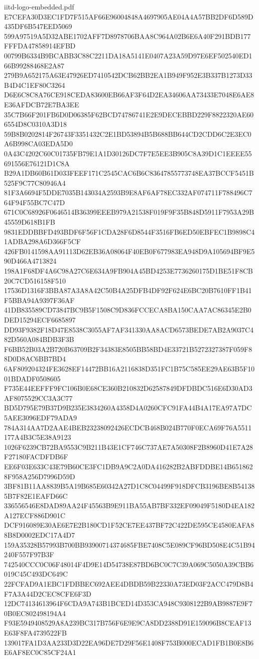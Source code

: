 \begin{filecontents*}[overwrite]{iitd-logo-embedded.pdf}
E7CEFA30D3EC1FD7F515AF66E96004848A4697905AE04A4A57BB2DF6D589D435DF6B547EED5069
599A97519A5D32ABE1702AFF7D8978706BAA8C964A02B6E6A40F291BDB177FFFDA47858914EFBD
00799B6334B9BCABB3C88C2211DA18A5141E0407A23A59D97E6EF502540ED166B99288468E2A87
279B9A652175A63E47926ED7410542DCB62BB2EA1B949F952E3B337B1273D33B4D4C1EF80C3264
D6E6C8C8A76CE918CEDA83600EB66AF3F64D2EA34606AA73433E7048E6AE8E36AFDCB72E7BA3EE
35C7B66F201FB6D0D06385F62BCD74786741E2E9DECEBBD229F8822320AE606554D8C0310A3D18
59B8B0202814F26743F3351432C2E1BD53894B5B688BB644CD2CDD6C2E3EC0A6B998CA03EDA5D0
0A43C4202C60C01735FB79E1A1D30126DC7F7E5EE3B905C8A39D1C1EEEE55691556E76121D1C8A
B29A1DB60B61D033FEEF171C2545CAC6B6C83647855773748EA37BCCF5451B525F9C77C80946A4
81F3A6694F5DDE7035B143034A2593B9E8AF6AF78EC332AF074711F788496C764F94F55BC7C47D
671C0C68926F0646514B36399EEEB979A21538F019F9F35B848D5911F7953A29B45559D618B1FB
9831EDDBBFD493BDF6F56F1CDA28F6D8544F3516FB6ED50EBFEC1B9898C41ADBA298A6D366F5CF
426FB0141598AA91113D62EB36A08064F40EB0F677983EA948D9A105694BF9E590D466A4713824
198A1F68DF4A6C98A27C6E634A9FB904A45BD4253E7736260175D1BE51F8CB20C7CD516158F510
17536D1316F3BBA87A3A8A42C50B4A25DFB4DF92F624E6BC20B7610FF1B41F5BBA94A9397F36AF
41DB835589CD73847BC9B5F1508C9D836FCCECA8BA150CAA7AC86345E2B0DED15294ECF6685897
DD93F9382F18D47E8538C3055AF7AF341330AA8ACD6573BEDE7AB2A9037C482D560A084BDB3F3B
F6BB52B03A2B720B63709B2F34383E8505BB58BD4E33721B5272327387F059F88D0D8AC6BB7BD4
6AF809204324FE3628EF14472BB16A2116838D351FC1B75C585EE29AE63B5F1001BDADF0508605
F735E44EEFFF9FC106B0E68CE360B210832D62587849DFDBDC516E6D30AD3AF8075529CC3A3C77
BD5D795E79B37D9B235E3834260A4358D4A0260CFC91FA44B4A17EA97A7DC5AEE3096EDF79ADA9
784A314AA7D2AAE4BEB23238092426ECDCB468B024B770F0ECA69F76A5511177A4B3C5E38A9123
1026F6239CB72BA9553C9B211B43E1CF746C737AE7A50308F2B8960D41E7A28F27180FACDFDB6F
EE6F03E633C43E79B60CE3FC1DB9A9C2A0DA416282B2ABFDDBE14B6518628F958A256D7996D59D
3BF81B11AA8839B5A19B685E60342A27D1C8C04499F918DFCB3196BE8B541385B7F82E1EAFD66C
336556546E8DAD89AA24F45563B9E911BA55AB7BF332EF09049F5180D4EA182A127ECF886D901C
DCF916089E30AE6E7E2B180CD1F52CE7EE437BF72C422DE595CE4580EAFA88B8D0002EDC17A4D7
159A35328B57993B700BB93900714374685FBE7408C5E089CF96BD508E4C51B94240F557F97B3F
742540CCC0C06F48014F4D9E14D54738E87BD6BC0C7C39A069C5050A39CBB6019C45C493DC649C
22FCFAD9A1EBC1FDBBEC692AEE4DBDB59B22330A73ED03F2ACC479D8B4F7A3A44D2CEC8CFE6F3D
12DC74134613964F6CDA9A743B1BCED14D353CA948C9308122B9AB9887E9F70B0EC802498194A4
F93E5949408529A8A239BC317B756F6E9E9CA8DD2388D91E159096B8CEAF13E63F8FA4739522FB
139017FA1D3AA233D3D22EA96DE7D29F56E1408F753B000ECAD1FB1B0E8B6E6AF8EC0C85CF24A1

\end{filecontents*}
